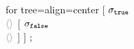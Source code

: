 \documentclass[varwidth=100cm,convert={density=120}]{standalone}
\begin{document}
	\begin{preview}
		\begin{forest} for tree={align=center}
			[
			{$\sigma_{\mathsf{\mathtt{true}}}$ \\
				\footnotesize $\color{gray} \langle \var{} \rangle$
			}
			[
			{$\sigma_{\mathsf{\mathtt{false}}}$ \\
				\footnotesize $\color{gray} \langle \var{} \rangle$
			}
			]
			]
			;
		\end{forest}
	\end{preview}
\end{document}
